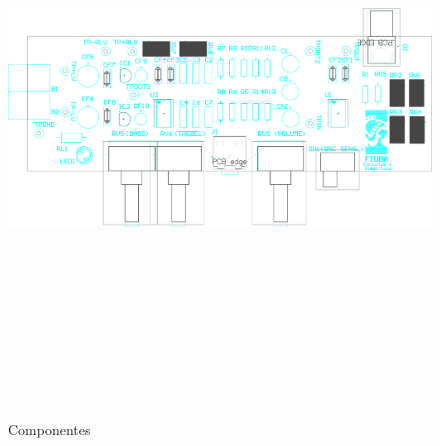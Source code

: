 \begin{figure}[H]
    \centering
    \includegraphics[height=150mm, angle=90]{img/PCB/layers/preamp/top-overlay.png}
    \caption\footnotesize{{Componentes}}
    \label{fig:pcb_preamp_top_overlay}
\end{figure}

\clearpage




















